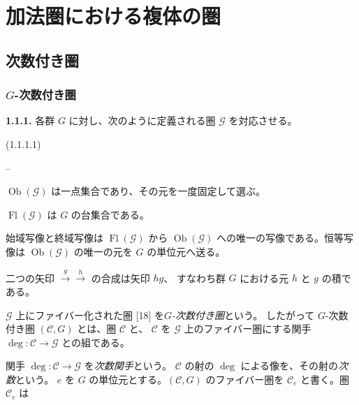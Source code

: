 \chapter{加法圏における複体の圏}

\section{次数付き圏}

\subsection{\texorpdfstring{$G$}{G}-次数付き圏}

\noindent\textbf{1.1.1.}\quad
各群 $G$ に対し、次のように定義される圏 $\mathcal G$ を対応させる。

\noindent\textnormal{(1.1.1.1)}
\begin{list}{--}{%
  \setlength{\leftmargin}{2em}%
  \setlength{\itemsep}{0.25em}%
  \setlength{\topsep}{0.25em}%
}
  \item {}%
    $\operatorname{Ob}(\mathcal G)$ は一点集合であり、その元を一度固定して選ぶ。
  \item {}%
    $\operatorname{Fl}(\mathcal G)$ は $G$ の台集合である。
  \item {}%
    始域写像と終域写像は $\operatorname{Fl}(\mathcal G)$ から
    $\operatorname{Ob}(\mathcal G)$ への唯一の写像である。恒等写像は
    $\operatorname{Ob}(\mathcal G)$ の唯一の元を $G$ の単位元へ送る。
  \item {}%
    二つの矢印 ${}\xrightarrow{g}{}\xrightarrow{h}{}$ の合成は矢印 $hg$、
    すなわち群 $G$ における元 $h$ と $g$ の積である。
\end{list}

$\mathcal G$ 上にファイバー化された圏 [18] を\emph{$G$-次数付き圏}という。
したがって $G$-次数付き圏 $(\mathcal C,G)$ とは、圏 $\mathcal C$ と、
$\mathcal C$ を $\mathcal G$ 上のファイバー圏にする関手
$\deg\colon\mathcal C\to\mathcal G$ との組である。

関手 $\deg\colon\mathcal C\to\mathcal G$ を\emph{次数関手}という。
$\mathcal C$ の射の $\deg$ による像を、その射の\emph{次数}という。
$e$ を $G$ の単位元とする。$(\mathcal C,G)$ のファイバー圏を
$\mathcal C_e$ と書く。圏 $\mathcal C_e$ は
